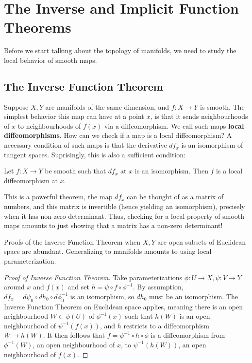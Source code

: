 \section{The Inverse and Implicit Function Theorems}

Before we start talking about the topology of manifolds, we need to study the local behavior of smooth maps. 

\subsection{The Inverse Function Theorem}

Suppose $X,Y$ are manifolds of the same dimension, and $f: X \to Y$ is smooth. The simplest behavior this map can have at a point $x$, is that it sends neighbourhoods of $x$ to neighbourhoods of $f(x)$ via a diffeomorphism. We call such maps \textbf{local diffeomorphisms}. How can we check if a map is a local diffeomorphism? A necessary condition of such maps is that the derivative $df_x$ is an isomorphism of tangent spaces. Suprisingly, this is also a sufficient condition:

\begin{theorem}
    Let $f: X \to Y$ be smooth such that $df_x$ at $x$ is an isomorphism. Then $f$ is a local diffeomorphism at $x$. 
\end{theorem}

This is a powerful theorem, the map $df_x$ can be thought of as a matrix of numbers, and this matrix is invertible (hence yielding an isomorphism), precisely when it has non-zero determinant. Thus, checking for a local property of smooth maps amounts to just showing that a matrix has a non-zero determinant! 

Proofs of the Inverse Function Theorem when $X,Y$ are open subsets of Euclidean space are abundant. Generalizing to manifolds amounts to using local parameterization. 

\begin{proof}[Proof of Inverse Function Theorem]
    Take parameterizations $\phi: U \to X, \psi: V \to Y$ around $x$ and $f(x)$ and set $h = \psi \circ f \circ \phi^{-1}$. By assumption, $df_x = d\psi_0 \circ dh_0 \circ d\phi^{-1}_0$ is an isomorphism, so $dh_0$ must be an isomorphism. The Inverse Function Theorem on Euclidean space applies, meaning there is an open neighbourhood $W \subset \phi(U)$ of $\phi^{-1}(x)$ such that $h(W)$ is an open neighbourhood of $\psi^{-1}(f(x))$, and $h$ restricts to a diffeomorphism $W \to h(W)$. It then follows that $f = \psi^{-1} \circ h \circ \phi$ is a diffeomorphism from $\phi^{-1}(W)$, an open neighbourhood of $x$, to $\psi^{-1}(h(W))$, an open neighbourhood of $f(x)$.
\end{proof}

